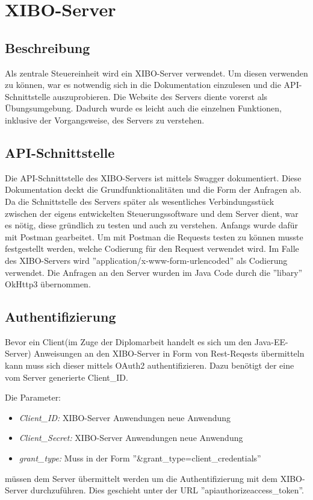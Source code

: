 \chapter{XIBO-Server}
\section{Beschreibung}
Als zentrale Steuereinheit wird ein XIBO-Server verwendet. Um diesen verwenden zu können, war es notwendig sich in die Dokumentation einzulesen und die API-Schnittstelle auszuprobieren. Die Website des Servers diente vorerst als Übungsumgebung. Dadurch wurde es leicht auch die einzelnen Funktionen, inklusive der Vorgangsweise, des Servers zu verstehen.
\cite{xibo-server}
\section{API-Schnittstelle}
Die API-Schnittstelle des XIBO-Servers ist mittels Swagger dokumentiert. Diese Dokumentation deckt die Grundfunktionalitäten und die Form der Anfragen ab. Da die Schnittstelle des Servers später als wesentliches Verbindungsstück zwischen der eigens entwickelten Steuerungssoftware und dem Server dient, war es nötig, diese gründlich zu testen und auch zu verstehen. Anfangs wurde dafür mit Postman gearbeitet. Um mit Postman die Requests testen zu können musste festgestellt werden, welche Codierung für den Request verwendet wird. Im Falle des XIBO-Servers wird ''application/x-www-form-urlencoded'' als Codierung verwendet. Die Anfragen an den Server wurden im Java Code durch die ''libary'' OkHttp3 übernommen.
\cite{swagger}
\cite{postman}
\cite{Okhttp3}
\section{Authentifizierung}
Bevor ein Client(im Zuge der Diplomarbeit handelt es sich um den Java-EE-Server) Anweisungen an den XIBO-Server in Form von Rest-Reqests übermitteln kann muss sich dieser mittels OAuth2 authentifizieren. Dazu benötigt der eine vom Server generierte Client\_ID.
\cite{oAuth2}

Die Parameter: 
\begin{itemize}
	\item {\em Client\_ID:} XIBO-Server Anwendungen neue Anwendung
	\item {\em Client\_Secret:}  XIBO-Server Anwendungen neue Anwendung
	\item{\em grant\_type:} Muss in der Form ''&grant\_type=client\_credentials''
\end{itemize}
müssen dem Server übermittelt werden um die Authentifizierung mit dem XIBO-Server durchzuführen. Dies geschieht unter der URL ''api\/authorize\/access\_token''.






